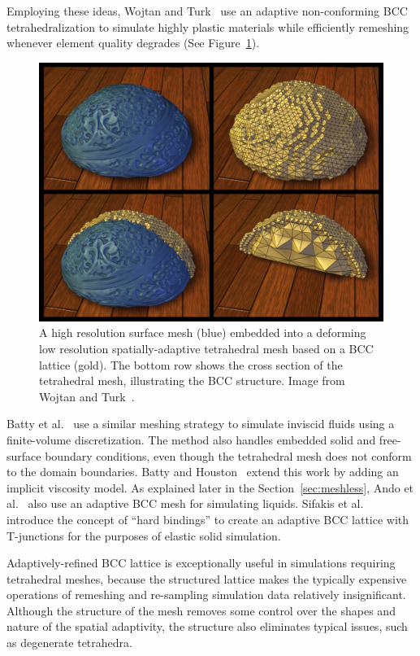 Employing these ideas, Wojtan and Turk~\cite{Wojtan2008} use an adaptive non-conforming BCC tetrahedralization to simulate highly plastic materials while efficiently remeshing whenever element quality degrades (See Figure~\ref{fig:WT_BCC}). 
\begin{figure}[!t]
	\centering
	\includegraphics[width=0.8\linewidth]{images/starAdaptivity-cgf2016/WT2008_BCC.png}
	\caption[STAR adaptivity: Body-centered cubic mesh]{A high resolution surface mesh (blue) embedded into a deforming low resolution spatially-adaptive tetrahedral mesh based on a BCC lattice (gold). The bottom row shows the cross section of the tetrahedral mesh, illustrating the BCC structure. Image from Wojtan and Turk~\cite{Wojtan2008}.}
	\label{fig:WT_BCC}
\end{figure}
Batty et al.~\cite{Batty2010} use a similar meshing strategy to simulate inviscid fluids using a finite-volume discretization. The method also handles embedded solid and free-surface boundary conditions, even though the tetrahedral mesh does not conform to the domain boundaries. Batty and Houston~\cite{Batty2011} extend this work by adding an implicit viscosity model. As explained later in the Section~\ref{sec:meshless}, Ando et al.~\cite{Ando2013} also use an adaptive BCC mesh for simulating liquids. Sifakis et al.~\cite{Sifakis2007:Hybrid} introduce the concept of ``hard bindings'' to create an adaptive BCC lattice with T-junctions for the purposes of elastic solid simulation.

Adaptively-refined BCC lattice is exceptionally useful in simulations requiring tetrahedral meshes, because the structured lattice makes the typically expensive operations of remeshing and re-sampling simulation data relatively insignificant. Although the structure of the mesh removes some control over the shapes and nature of the spatial adaptivity, the structure also eliminates typical issues, such as degenerate tetrahedra.


